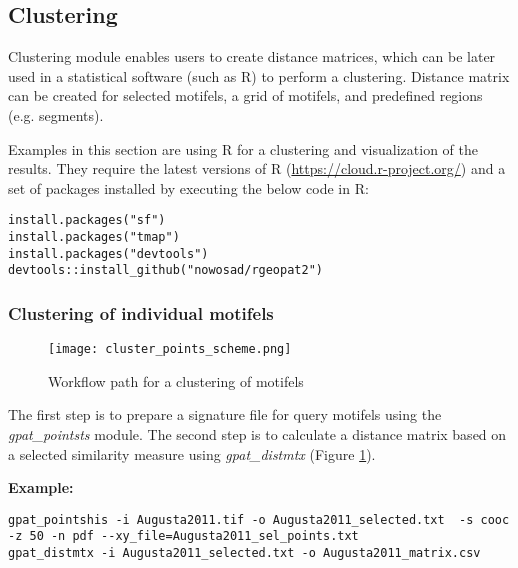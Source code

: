 \FloatBarrier

\subsection{Clustering}

Clustering module enables users to create distance matrices, which can be later used in a statistical software (such as R) to perform a clustering.
Distance matrix can be created for selected motifels, a grid of motifels, and predefined regions (e.g. segments).

Examples in this section are using R for a clustering and visualization of the results. 
They require the latest versions of R (\url{https://cloud.r-project.org/}) and a set of packages installed by executing the below code in R:

\begin{minipage}{\linewidth}
\begin{lstlisting}
install.packages("sf")
install.packages("tmap")
install.packages("devtools")
devtools::install_github("nowosad/rgeopat2")
\end{lstlisting}
\end{minipage}

\subsubsection{Clustering of individual motifels}

\begin{figure}[H]
	\centering
	\texttt{[image: cluster\_points\_scheme.png]}
	\caption{Workflow path for a clustering of motifels}
	\label{FIG:CLUSTER_POINTS}
\end{figure}

The first step is to prepare a signature file for query motifels using the {\it gpat\_pointsts} module. 
The second step is to calculate a distance matrix based on a selected similarity measure using {\it gpat\_distmtx} (Figure \ref{FIG:CLUSTER_POINTS}).

{\bf Example:}

\begin{minipage}{\linewidth}
\begin{lstlisting}
gpat_pointshis -i Augusta2011.tif -o Augusta2011_selected.txt  -s cooc -z 50 -n pdf --xy_file=Augusta2011_sel_points.txt
gpat_distmtx -i Augusta2011_selected.txt -o Augusta2011_matrix.csv
\end{lstlisting}
\end{minipage}

